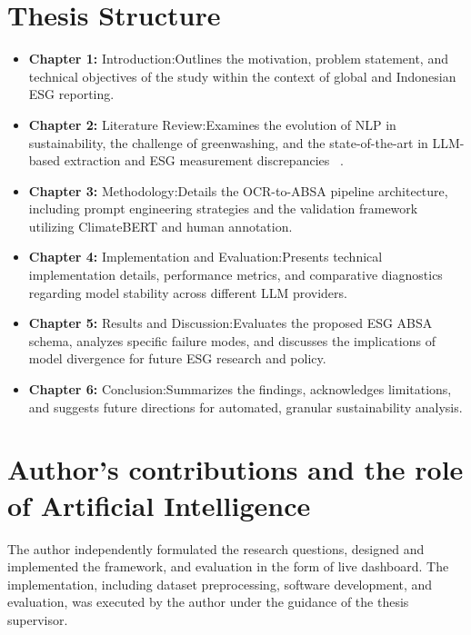 \section{Thesis Structure}
\begin{itemize}
\item 

\textbf{Chapter 1:} Introduction:Outlines the motivation, problem statement, and technical objectives of the study within the context of global and Indonesian ESG reporting.\item 

\textbf{Chapter 2:} Literature Review:Examines the evolution of NLP in sustainability, the challenge of greenwashing, and the state-of-the-art in LLM-based extraction and ESG measurement discrepancies  ~\cite{p__raghavendra_rau_a32af285}.\item 

\textbf{Chapter 3:} Methodology:Details the OCR-to-ABSA pipeline architecture, including prompt engineering strategies and the validation framework utilizing ClimateBERT and human annotation.\item 

\textbf{Chapter 4:} Implementation and Evaluation:Presents technical implementation details, performance metrics, and comparative diagnostics regarding model stability across different LLM providers.\item 

\textbf{Chapter 5:} Results and Discussion:Evaluates the proposed ESG ABSA schema, analyzes specific failure modes, and discusses the implications of model divergence for future ESG research and policy.\item 

\textbf{Chapter 6:} Conclusion:Summarizes the findings, acknowledges limitations, and suggests future directions for automated, granular sustainability analysis.
\end{itemize}

\section{Author's contributions and the role of Artificial Intelligence}

The author independently formulated the research questions, designed and implemented the framework, and evaluation in the form of live dashboard. The implementation, including dataset preprocessing, software development, and evaluation, was executed by the author under the guidance of the thesis supervisor. 

